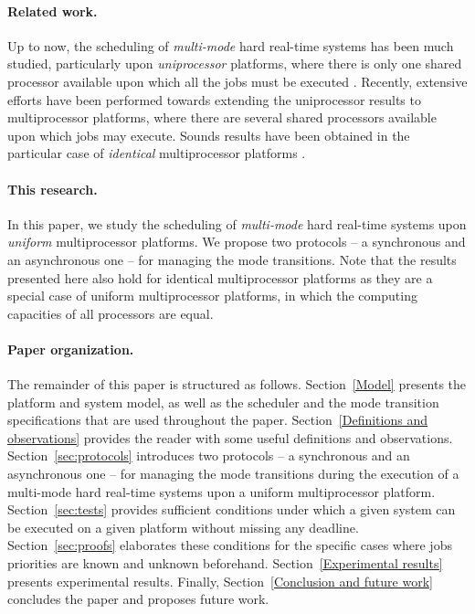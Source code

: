 \documentclass[10pt,english,a4paper]{article}
\newtheorem{validity test}{Validity Test}
\begin{document}
\paragraph{Related work.} Up to now, the scheduling of {\em multi-mode} hard real-time systems has been much studied, particularly upon {\em uniprocessor} platforms, where there is only one shared processor available upon which all the jobs must be executed \cite{Real, Andersson0}. Recently, extensive efforts have been performed towards extending the uniprocessor results to multiprocessor platforms, where there are several shared processors available upon which jobs may execute. Sounds results have been obtained in the particular case of {\em identical} multiprocessor platforms \cite{Lopez1, Nelis1}. 

\paragraph{This research.} In this paper, we study the scheduling of {\em multi-mode} hard real-time systems upon {\em uniform} multiprocessor platforms. We propose two protocols -- a synchronous and an asynchronous one -- for managing the mode transitions. Note that the results presented here also hold for identical multiprocessor platforms as they are a special case of uniform multiprocessor platforms, in which the computing capacities of all processors are equal. 

\paragraph{Paper organization.} The remainder of this paper is structured as follows. Section~\ref{Model} presents the platform and system model, as well as the scheduler and the mode transition specifications that are used throughout the paper. Section~\ref{Definitions and observations} provides the reader with some useful definitions and observations. Section~\ref{sec:protocols} introduces two protocols -- a synchronous and an asynchronous one -- for managing the mode transitions during the execution of a multi-mode hard real-time systems upon a uniform multiprocessor platform. Section~\ref{sec:tests} provides sufficient conditions under which a given system can be executed on a given platform without missing any deadline. Section~\ref{sec:proofs} elaborates these conditions for the specific cases where jobs priorities are known and unknown beforehand. Section~\ref{Experimental results} presents experimental results. Finally, Section~\ref{Conclusion and future work} concludes the paper and proposes future work.
\end{document}
